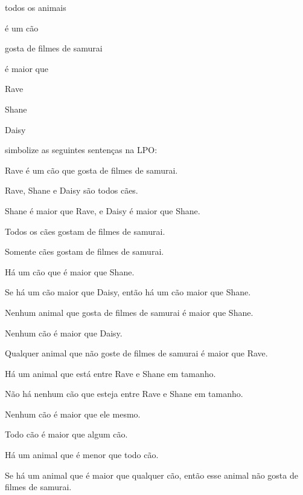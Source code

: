 \begin{ekey}
\item[\text{domínio}] todos os animais
\item[\atom{D}{x}]  é um cão
\item[\atom{S}{x}]  gosta de filmes de samurai
\item[\atom{L}{x,y}]  é maior que 
\item[r] Rave
\item[h] Shane
\item[d] Daisy
\end{ekey}
simbolize as seguintes sentenças na LPO:
\begin{compactlist}
\item Rave é um cão que gosta de filmes de samurai.
\item Rave, Shane e Daisy são todos cães.
\item Shane é maior que Rave, e Daisy é maior que Shane.
\item Todos os cães gostam de filmes de samurai.
\item Somente cães gostam de filmes de samurai.
\item Há um cão que é maior que Shane.
\item Se há um cão maior que Daisy, então há um cão maior que Shane.
\item Nenhum animal que gosta de filmes de samurai é maior que Shane.
\item Nenhum cão é maior que Daisy.
\item Qualquer animal que não goste de filmes de samurai é maior que Rave.
\item Há um animal que está entre Rave e Shane em tamanho.
\item Não há nenhum cão que esteja entre Rave e Shane em tamanho.
\item Nenhum cão é maior que ele mesmo.
\item Todo cão é maior que algum cão.
\item Há um animal que é menor que todo cão.
\item Se há um animal que é maior que qualquer cão, então esse animal não gosta de filmes de samurai.
\end{compactlist}

